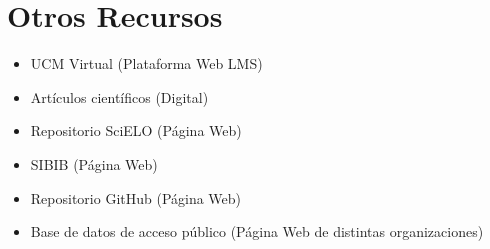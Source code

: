 \documentclass[11pt,letter,]{article}
\providecommand{\tightlist}{%
  \setlength{\itemsep}{0pt}\setlength{\parskip}{0pt}}
\begin{document}
\hypertarget{otros-recursos}{%
\section{Otros Recursos}\label{otros-recursos}}

\begin{itemize}
\tightlist
\item
  UCM Virtual (Plataforma Web LMS)
\item
  Artículos científicos (Digital)
\item
  Repositorio SciELO (Página Web)
\item
  SIBIB (Página Web)
\item
  Repositorio GitHub (Página Web)
\item
  Base de datos de acceso público (Página Web de distintas
  organizaciones)
\end{itemize}
\end{document}
